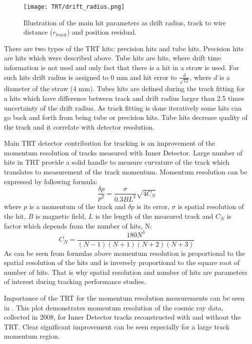 \begin{figure}
\centering
\texttt{[image: TRT/drift\_radius.png]}
\caption{ 
 Illustration of the main hit parameters as drift radius, track to wire distance ($r_{track}$) and position residual.
}
\label{fig:drift_radius}
\end{figure}

There are two types of the TRT hits: precision hits and tube hits. Precision hits are hits which were described above. Tube hits are hits, where drift time 
information is not used and only fact that there is a hit in a straw is used. For such hits drift radius is assigned to 0 mm and hit error to $\frac{d}{\sqrt{12}}$, where
$d$ is a diameter of the straw (4 mm). Tubes hits are defined during the track fitting for a hits which have difference between track and drift radius larger than
2.5 times uncertainty of the drift radius. As track fitting is done iteratively some hits can go back and forth from being tube or precision hits.
Tube hits decrease quality of the track and it correlate with detector resolution.


Main TRT detector contribution for tracking is an improvement of the momentum resolution of tracks measured with Inner Detector. Large number of hits in TRT provide
a solid handle to measure curvature of the track which translates to measurement of the track momentum. Momentum resolution can be expressed by following formula:
\begin{equation}
 \dfrac{\delta p}{p^2} = \dfrac{\sigma}{0.3BL^2}\sqrt{4C_N}
 \label{eq:momentum_resolution}
\end{equation}
where $p$ is a momentum of the track and $\delta p$ is its error, $\sigma$ is spatial resolution of the hit, $B$ is magnetic field, $L$ is the length of the measured track
and $C_N$ is factor which depends from the number of hits, N:
\begin{equation}
 C_N = \dfrac{180N^3}{(N-1)(N+1)(N+2)(N+3)}
\end{equation}
As can be seen from formulas above momentum resolution is proportional to the spatial resolution of the hits and is inversely proportional to the square root of 
number of hits. That is why spatial resolution and number of hits are parameters of interest during tracking performance studies.


Importance of the TRT for the momentum resolution measurements can be seen in .
This plot demonstrates momentum resolution of the cosmic ray data, collected in 2008, for Inner Detector tracks reconstructed with and without the TRT.
Clear significant improvement can be seen especially for a large track momentum region.


